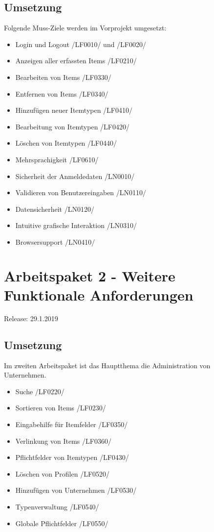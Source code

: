\documentclass[11pt,a4paper]{report}
\begin{document}
\subsection{Umsetzung}
Folgende Muss-Ziele werden im Vorprojekt umgesetzt:
\begin{itemize}
\item Login und Logout /LF0010/ und /LF0020/
\item Anzeigen aller erfassten Items /LF0210/
\item Bearbeiten von Items /LF0330/
\item Entfernen von Items /LF0340/
\item Hinzufügen neuer Itemtypen /LF0410/
\item Bearbeitung von Itemtypen /LF0420/
\item Löschen von Itemtypen /LF0440/
\item Mehrsprachigkeit /LF0610/
\item Sicherheit der Anmeldedaten /LN0010/
\item Validieren von Benutzereingaben /LN0110/
\item Datensicherheit /LN0120/
\item Intuitive grafische Interaktion /LN0310/
\item Browsersupport /LN0410/
\end{itemize}

\section{Arbeitspaket 2 - Weitere Funktionale Anforderungen }
Release: 29.1.2019
\subsection{Umsetzung}
Im zweiten Arbeitspaket ist das Hauptthema die Administration von Unternehmen.
\begin{itemize}
\item Suche /LF0220/
\item Sortieren von Items /LF0230/
\item Eingabehilfe für Itemfelder /LF0350/
\item Verlinkung von Items /LF0360/
\item Pflichtfelder von Itemtypen /LF0430/
\item Löschen von Profilen /LF0520/
\item Hinzufügen von Unternehmen /LF0530/
\item Typenverwaltung /LF0540/
\item Globale Pflichtfelder /LF0550/
\end{itemize}
\end{document}
